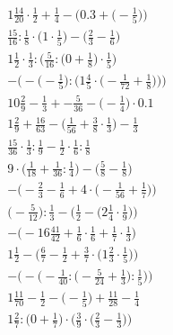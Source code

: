 \documentclass[8pt]{article}
\begin{document}
\begin{align}
1\frac{14}{20} \cdot \frac{1}{2} + \frac{1}{4} - \Big(0.3 + \big(-\frac{1}{5}\big)\Big) \\
\frac{15}{16} : \frac{1}{8} \cdot \big(1 \cdot \frac{1}{5}\big) - \big(\frac{2}{3} - \frac{1}{6}\big) \\
1\frac{1}{2} \cdot \frac{1}{3} : \Big(\frac{5}{16} : \big(0 + \frac{1}{8}\big) \cdot \frac{1}{5}\Big) \\
-\bigg(-\Big(-\frac{1}{5}\Big) : \Big(1\frac{4}{5} \cdot \big(-\frac{1}{72} + \frac{1}{8}\big)\Big)\bigg) \\
10\frac{2}{9} - \frac{1}{3} + -\frac{5}{36} - \big(-\frac{1}{4}\big) \cdot 0.1 \\
1\frac{2}{9} + \frac{16}{63} - \big(\frac{1}{56} + \frac{3}{8} \cdot \frac{1}{3}\big) - \frac{1}{3} \\
\frac{15}{36} \cdot \frac{1}{3} : \frac{1}{9} - \frac{1}{2} \cdot \frac{1}{6} : \frac{1}{8} \\
9 \cdot \big(\frac{1}{18} + \frac{1}{36} : \frac{1}{4}\big) - \big(\frac{5}{8} - \frac{1}{8}\big) \\
-\Big(-\frac{2}{3} - \frac{1}{6} + 4 \cdot \big(-\frac{1}{56} + \frac{1}{7}\big)\Big) \\
\Big(-\frac{5}{12}\Big) : \frac{1}{3} - \Big(\frac{1}{2} - \big(2\frac{1}{4} \cdot \frac{1}{9}\big)\Big) \\
-\big(-16\frac{41}{42} + \frac{1}{6} \cdot \frac{1}{6} + \frac{1}{7} \cdot \frac{1}{3}\big) \\
1\frac{1}{2} - \Big(\frac{6}{7} - \frac{1}{2} + \frac{3}{7} \cdot \big(1\frac{2}{3} \cdot \frac{1}{5}\big)\Big) \\
-\bigg(-\Big(-\frac{1}{40} : \big(-\frac{5}{24} + \frac{1}{3}\big) : \frac{1}{5}\Big)\bigg) \\
1\frac{11}{70} - \frac{1}{2} - \big(-\frac{1}{5}\big) + \frac{11}{28} - \frac{1}{4} \\
1\frac{2}{7} : \Big(0 + \frac{1}{7}\Big) \cdot \Big(\frac{3}{9} \cdot \big(\frac{2}{3} - \frac{1}{3}\big)\Big)
\end{align}
\end{document}
